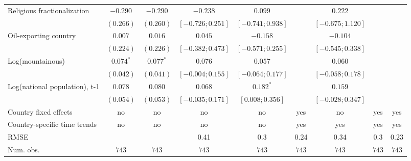 \begin{table}
\begin{center}
\begin{tabular}{l c c c c c c c c}
Religious fractionalization       & $-0.290$    & $-0.290$    & $-0.238$           & $0.099$            &                    & $0.222$             &                     &                    \\
                                  & $(0.266)$   & $(0.260)$   & $ [-0.726; 0.251]$ & $ [-0.741; 0.938]$ &                    & $ [-0.675;  1.120]$ &                     &                    \\
Oil-exporting country             & $0.007$     & $0.016$     & $0.045$            & $-0.158$           &                    & $-0.104$            &                     &                    \\
                                  & $(0.224)$   & $(0.226)$   & $ [-0.382; 0.473]$ & $ [-0.571; 0.255]$ &                    & $ [-0.545;  0.338]$ &                     &                    \\
Log(mountainous)                  & $0.074^{*}$ & $0.077^{*}$ & $0.076$            & $0.057$            &                    & $0.060$             &                     &                    \\
                                  & $(0.042)$   & $(0.041)$   & $ [-0.004; 0.155]$ & $ [-0.064; 0.177]$ &                    & $ [-0.058;  0.178]$ &                     &                    \\
Log(national population), t-1     & $0.078$     & $0.080$     & $0.068$            & $0.182^{*}$        &                    & $0.159$             &                     &                    \\
                                  & $(0.054)$   & $(0.053)$   & $ [-0.035; 0.171]$ & $ [ 0.008; 0.356]$ &                    & $ [-0.028;  0.347]$ &                     &                    \\
\hline
Country fixed effects             & no          & no          & no                 & no                 & yes                & no                  & yes                 & yes                \\
Country-specific time trends      & no          & no          & no                 & no                 & yes                & yes                 & yes                 & yes                \\
RMSE                              &             &             & 0.41               & 0.3                & 0.24               & 0.34                & 0.3                 & 0.23               \\
Num. obs.                         & $743$       & $743$       & $743$              & $743$              & $743$              & $743$               & $743$               & $743$              \\

\end{tabular}
\end{center}
\end{table}
